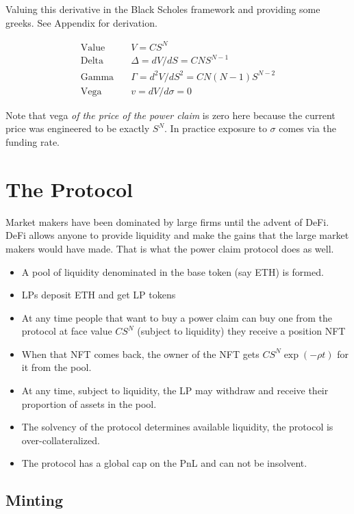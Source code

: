 \documentclass[12pt]{article}
\begin{document}
    Valuing this derivative in the Black Scholes framework and providing some greeks. See Appendix for derivation.

    \begin{align*}
        \text{Value}\quad & V = C S^N\\
        \text{Delta}\quad & \Delta = dV/dS = C N S^{N-1}\\
        \text{Gamma}\quad & \Gamma = d^2 V / d S^2 = C N(N-1) S^{N-2} \\
        \text{Vega}\quad & v = dV/d\sigma =  0
    \end{align*}

    Note that vega \emph{of the price of the power claim} is zero here because the current price was engineered to be exactly $S^N$. In practice exposure to $\sigma$ comes via the funding rate.

    \section{The Protocol}

    Market makers have been dominated by large firms until the advent of DeFi. DeFi allows anyone to provide liquidity and make the gains that the large market makers would have made. That is what the power claim protocol does as well.

    \begin{itemize}
        \item A pool of liquidity denominated in the base token (say ETH) is formed.
        \item LPs deposit ETH and get LP tokens
        \item At any time people that want to buy a power claim can buy one from the protocol at face value $CS^N$ (subject to liquidity) they receive a position NFT
        \item When that NFT comes back, the owner of the NFT gets $CS^N \exp(-\rho t)$ for it from the pool.
        \item At any time, subject to liquidity, the LP may withdraw and receive their proportion of assets in the pool.
        \item The solvency of the protocol determines available liquidity, the protocol is over-collateralized.
        \item The protocol has a global cap on the PnL and can not be insolvent.
    \end{itemize}

    \subsection{Minting}
\end{document}
